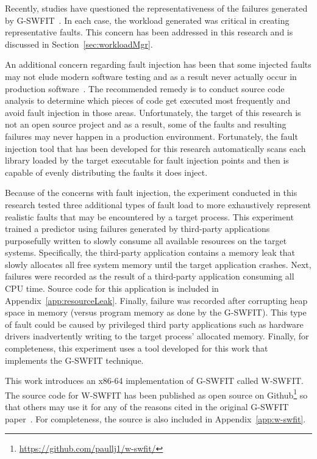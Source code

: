 Recently, studies have questioned the representativeness of the failures
generated by \ac{G-SWFIT}~\cite{cotroneo2012,kikuchi2014}.  In each case, the
workload generated was critical in creating representative faults.  This
concern has been addressed in this research and is discussed in
Section~\ref{sec:workloadMgr}.

An additional concern regarding fault injection has been that some injected
faults may not elude modern software testing and as a result never actually
occur in production software~\cite{natella2010}.  The recommended remedy is to
conduct source code analysis to determine which pieces of code get executed
most frequently and avoid fault injection in those areas.  Unfortunately, the
target of this research is not an open source project and as a result, some of
the faults and resulting failures may never happen in a production environment.
Fortunately, the fault injection tool that has been developed for this research
automatically scans each library loaded by the target executable for fault
injection points and then is capable of evenly distributing the faults it does
inject.

Because of the concerns with fault injection, the experiment conducted in this
research tested three additional types of fault load to more exhaustively
represent realistic faults that may be encountered by a target process.  This
experiment trained a predictor using failures generated by third-party
applications purposefully written to slowly consume all available resources on
the target systems.  Specifically, the third-party application contains a
memory leak that slowly allocates all free system memory until the target
application crashes.  Next, failures were recorded as the result of a
third-party application consuming all \ac{CPU} time.  Source code for this
application is included in Appendix~\ref{app:resourceLeak}.  Finally, failure
was recorded after corrupting heap space in memory (versus program memory as
done by the \ac{G-SWFIT}).  This type of fault could be caused by privileged
third party applications such as hardware drivers inadvertently writing to the
target process' allocated memory.  Finally, for completeness, this experiment
uses a tool developed for this work that implements the \ac{G-SWFIT} technique.

This work introduces an x86-64 implementation of \ac{G-SWFIT} called
\ac{W-SWFIT}.  The source code for \ac{W-SWFIT} has been published as open
source on Github\footnote{\url{https://github.com/paullj1/w-swfit/}} so that
others may use it for any of the reasons cited in the original \ac{G-SWFIT}
paper~\cite{gswfit}.  For completeness, the source is also included in
Appendix~\ref{app:w-swfit}.  

